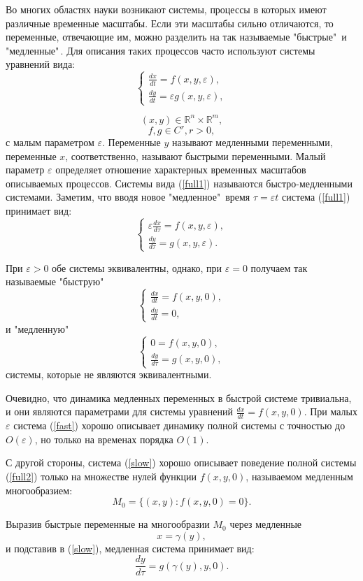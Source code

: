 Во многих областях науки возникают системы, процессы в которых имеют различные временные масштабы. Если эти масштабы сильно отличаются, то переменные, отвечающие им, можно разделить на так называемые "быстрые"\, и "медленные"\,. Для описания таких процессов часто используют системы уравнений вида:
\begin{equation}
\begin{cases}
    \frac{dx}{dt} = f(x,y,\varepsilon) ,\\
    \frac{dy}{dt} = \varepsilon g(x,y,\varepsilon),
\end{cases}
\label{full1}
\end{equation}

$$(x,y) \in \mathbb{R}^n \times \mathbb{R}^m,$$
$$f,g \in C^r, r>0,$$
с малым параметром $\varepsilon$. Переменные $y$ называют медленными переменными, переменные $x$, соответственно, называют быстрыми переменными. Малый параметр 
$\varepsilon$ определяет отношение характерных временных масштабов описываемых процессов. Системы вида (\ref{full1}) называются быстро-медленными системами.
Заметим, что вводя новое "медленное"\, время $\tau = \varepsilon t$ система (\ref{full1}) принимает вид:
\begin{equation}
\begin{cases}
    \varepsilon \frac{dx}{d \tau} = f(x,y,\varepsilon), \\
    \frac{dy}{d \tau} = g(x,y,\varepsilon).
\end{cases}
\label{full2}
\end{equation}

При $\varepsilon>0$ обе системы эквивалентны, однако, при $\varepsilon = 0$ получаем так называемые "быструю"\,
\begin{equation}
\begin{cases}
    \frac{dx}{dt} = f(x,y,0), \\
    \frac{dy}{dt} = 0,
\end{cases}
\label{fast}
\end{equation}
и "медленную"\,
\begin{equation}
\begin{cases}
    0 = f(x,y,0), \\
    \frac{dy}{d \tau} = g(x,y,0),
\end{cases}
\label{slow}
\end{equation}
системы, которые не являются эквивалентными.

Очевидно, что динамика медленных переменных в быстрой системе тривиальна, и они являются параметрами для системы уравнений $\frac{dx}{dt} = f(x,y,0)$. При малых $\varepsilon$ система (\ref{fast}) хорошо описывает динамику полной системы с точностью до $O(\varepsilon)$, но только на временах порядка $O(1)$.

С другой стороны, система (\ref{slow}) хорошо описывает поведение полной системы (\ref{full2}) только на множестве нулей функции $f(x,y,0)$, называемом медленным многообразием:
$$M_0 = \{ (x,y): f(x,y,0) = 0 \}.$$

Выразив быстрые переменные на многообразии $M_{0}$ через медленные
$$x = \gamma(y),$$
и подставив в (\ref{slow}), медленная система принимает вид:
$$\frac{dy}{d \tau} = g(\gamma(y), y, 0).$$